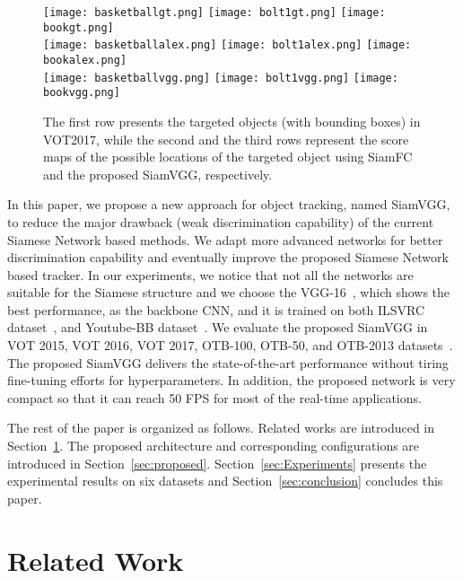 \documentclass[runningheads]{llncs}
\begin{document}
\begin{figure}[t]
\centering
\texttt{[image: basketballgt.png]}
\texttt{[image: bolt1gt.png]}
\texttt{[image: bookgt.png]}\\
\texttt{[image: basketballalex.png]}
\texttt{[image: bolt1alex.png]}
\texttt{[image: bookalex.png]}\\
\texttt{[image: basketballvgg.png]}
\texttt{[image: bolt1vgg.png]}
\texttt{[image: bookvgg.png]}

\caption{The first row presents the targeted objects (with bounding boxes) in VOT2017, while the second and the third rows represent the  
score maps of the possible locations of the targeted object using SiamFC and the proposed SiamVGG, respectively.
}
\vspace{-18pt}
\label{fig:comparison}
\end{figure}

In this paper, we propose a new approach for object tracking, named SiamVGG, to reduce the major drawback (weak discrimination capability) of the current Siamese Network based methods. We adapt more advanced networks for better discrimination capability and eventually improve the proposed Siamese Network based tracker. In our experiments, we notice that not all the networks are suitable for the Siamese structure and we choose the VGG-16~\cite{simonyan2014very}, which shows the best performance, as the backbone CNN, and it is trained on both ILSVRC dataset~\cite{krizhevsky2012imagenet}, and Youtube-BB dataset~\cite{real2017youtube}. We evaluate the proposed SiamVGG in VOT 2015, VOT 2016, VOT 2017, OTB-100, OTB-50, and OTB-2013 datasets~\cite{WuLimYang13,Kristan2017a,VOT_TPAMI}. The proposed SiamVGG delivers the state-of-the-art performance without tiring fine-tuning efforts for hyperparameters. In addition, the proposed network is very compact so that it can reach 50 FPS for most of the real-time applications.

The rest of the paper is organized as follows. Related works are introduced in Section~\ref{sec:Related}.
The proposed architecture and corresponding configurations are introduced in Section~\ref{sec:proposed}. Section~\ref{sec:Experiments} presents the experimental results on six datasets and Section~\ref{sec:conclusion} concludes this paper.

\section{Related Work}
\label{sec:Related}
\end{document}
